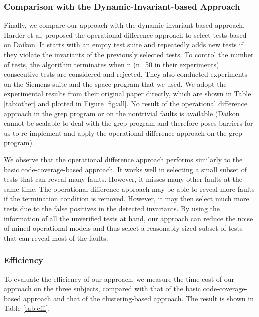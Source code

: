 \documentclass{sig-alternate}
\begin{document}
\subsubsection{Comparison with the Dynamic-Invariant-based Approach}

Finally, we compare our approach with the dynamic-invariant-based
approach. Harder et al. \cite{Harder03} proposed the operational
difference approach to select tests based on Daikon. It starts with
an empty test suite and repeatedly adds new tests if they violate
the invariants of the previously selected tests. To control the
number of tests, the algorithm terminates when n (n=50 in their
experiments) consecutive tests are considered and rejected. They
also conducted experiments on the Siemens suite and the space
program that we used. We adopt the experimental results from their
original paper directly, which are shown in Table \ref{tab:other}
and plotted in Figure \ref{fig:all}. No result of the operational
difference approach in the grep program or on the nontrivial faults
is available (Daikon cannot be scalable to deal with the grep
program and therefore poses barriers for us to re-implement and
apply the operational difference approach on the grep program).



We observe that the operational difference approach performs
similarly to the basic code-coverage-based approach. It works well
in selecting a small subset of tests that can reveal many faults.
However, it misses many other faults at the same time. The
operational difference approach may be able to reveal more faults if
the termination condition is removed. However, it may then select
much more tests due to the false positives in the detected
invariants. By using the information of all the unverified tests at
hand, our approach can reduce the noise of mined operational models
and thus select a reasonably sized subset of tests that can reveal
most of the faults.





\subsubsection{Efficiency}



To evaluate the efficiency of our approach, we measure the time cost
of our approach on the three subjects, compared with that of the
basic code-coverage-based approach and that of the clustering-based
approach. The result is shown in Table \ref{tab:effi}.
\end{document}

